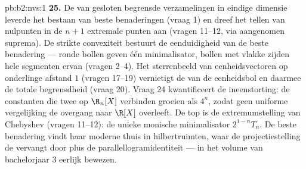 \begin{solution}{pb:b2:nvs:1}
\textbf{25.} De  van gesloten begrensde verzamelingen in
eindige dimensie leverde het bestaan van beste benaderingen (vraag
1) en dreef het tellen van nulpunten in de $n + 1$ extremale punten
aan (vragen 11--12, via aangenomen suprema). De strikte convexiteit
bestuurt de eenduidigheid van de beste benadering --- ronde bollen
geven één minimalisator, bollen met vlakke zijden hele segmenten
ervan (vragen 2--4). Het sterrenbeeld van eenheidsvectoren op
onderlinge afstand $1$ (vragen 17--19) vernietigt de 
van de eenheidsbol en daarmee de totale begrensdheid (vraag 20).
Vraag 24 kwantificeert de ineenstorting: de constanten die twee
 op $\R_n[X]$ verbinden groeien als $4^n$, zodat geen
uniforme vergelijking de overgang naar $\R[X]$ overleeft. De top is
de extremumstelling van Chebyshev (vragen 11--12): de unieke
monische minimalisator $2^{1-n}T_n$. De beste benadering vindt haar
moderne thuis in hilbertruimten, waar de projectiestelling de
 vervangt door  plus de
parallellogramidentiteit --- in het volume van bachelorjaar 3
eerlijk bewezen.
\end{solution}
